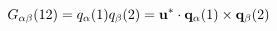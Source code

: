 \begin{equation}                      
G_{\alpha \beta}(12) = q_{\alpha}(1) q_{\beta}(2) = {\bf u}^{*}                       
\cdot{\bf q}_{\alpha}(1) \times {\bf q}_{\beta}(2)                      
\end{equation} 
